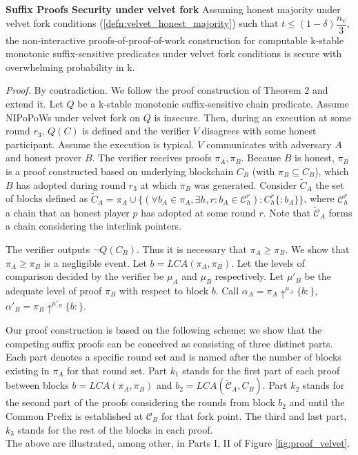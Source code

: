 \begin{thm}{\textbf{Suffix Proofs Security under velvet fork}}
	Assuming honest majority under velvet fork conditions (\ref{defn:velvet_honest_majority}) such that $t \leq (1 - \delta) \dfrac{n_v}{3}$, the non-interactive proofs-of-proof-of-work construction for computable k-stable monotonic suffix-sensitive predicates under velvet fork conditions is secure with overwhelming probability in k.
\end{thm}
\textit{Proof.} By contradiction. We follow the proof construction of Theorem 2
and extend it. Let $Q$ be a k-stable monotonic suffix-sensitive chain
predicate. Assume NIPoPoWs under velvet fork on $Q$ is insecure. Then, during
an execution at some round  $r_3$, $Q(C)$ is defined and the verifier $V$
disagrees with some honest participant. Assume the execution is typical. $V$
communicates with adversary $A$ and honest prover $B$. The verifier receives
proofs $\pi_A, \pi_B$. Because $B$ is honest, $\pi_B$ is a proof constructed
based on underlying blockchain $C_B$ (with $\pi_B \subseteq C_B$), which $B$
has adopted during round $r_3$ at which $\pi_B$ was generated. Consider $\widetilde{C}_A$ the set of blocks defined as $\widetilde{C}_A = \pi_A \cup \{ (\forall b_A \in \pi_A, \exists h,r : b_A \in \mathcal{C}_{h}^{r}): C_h^r\{:b_A\} \}$, where $\mathcal{C}_h^r$ a chain that an honest player $p$ has adopted at some round $r$. Note that $\widetilde{\mathcal{C}}_A$ forms a chain considering the interlink pointers.

The verifier outputs $\neg Q(C_B)$. Thus it is necessary that $\pi_A \geq \pi_B$.
We show that $\pi_A \geq \pi_B$ is a negligible event.
Let $b = LCA(\pi_A, \pi_B)$. Let the levels of comparison decided by the verifier
be $\mu_A$ and $\mu_B$ respectively. Let $\mu'_B$ be the adequate level of proof
$\pi_B$  with respect to block $b$. Call $\alpha_A = \pi_A \uparrow^{\mu_A}\{b:\}$,
$\alpha'_B = \pi_B \uparrow^{\mu'_B}\{b:\}$.

Our proof construction is based on the following scheme: we show that the competing
suffix proofs can be conceived as consisting of three distinct parts. Each part
denotes a specific round set and is named after the number of blocks existing
in $\pi_A$ for that round set. Part $k_1$ stands for the first part of each proof
between blocks $b = LCA(\pi_A, \pi_B)$ and $b_2 = LCA(\widetilde{\mathcal{C}}_A, C_B)$. Part $k_2$ stands for the second part
of the proofs considering the rounds from block $b_2$ and until
the Common Prefix is established at $\mathcal{C}_B$ for that fork point.
The third and last part, $k_3$ stands for the rest of the blocks in each proof.\\
The above are illustrated, among other, in Parts I, II of Figure \ref{fig:proof_velvet}.

